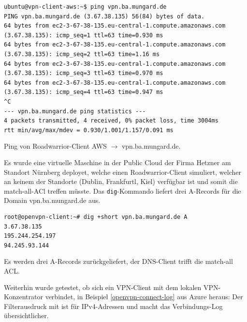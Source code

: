 \begin{listing}[h]
\begin{verbatim}
ubuntu@vpn-client-aws:~$ ping vpn.ba.mungard.de
PING vpn.ba.mungard.de (3.67.38.135) 56(84) bytes of data.
64 bytes from ec2-3-67-38-135.eu-central-1.compute.amazonaws.com (3.67.38.135): icmp_seq=1 ttl=63 time=0.930 ms
64 bytes from ec2-3-67-38-135.eu-central-1.compute.amazonaws.com (3.67.38.135): icmp_seq=2 ttl=63 time=1.16 ms
64 bytes from ec2-3-67-38-135.eu-central-1.compute.amazonaws.com (3.67.38.135): icmp_seq=3 ttl=63 time=0.970 ms
64 bytes from ec2-3-67-38-135.eu-central-1.compute.amazonaws.com (3.67.38.135): icmp_seq=4 ttl=63 time=0.947 ms
^C
--- vpn.ba.mungard.de ping statistics ---
4 packets transmitted, 4 received, 0% packet loss, time 3004ms
rtt min/avg/max/mdev = 0.930/1.001/1.157/0.091 ms

\end{verbatim}
\caption{Ping von Roadwarrior-Client AWS $\rightarrow$ vpn.ba.mungard.de.}
\label{ping-aws-ip}
\end{listing}\FloatBarrier
Es wurde eine virtuelle Maschine in der Public Cloud der Firma Hetzner am Standort Nürnberg deployet, welche einen Roadwarrior-Client simuliert, welcher an keinem der Standorte (Dublin, Frankfurtl, Kiel) verfügbar ist und somit die \glqq match-all\grqq-ACl treffen müsste. Das \texttt{dig}-Kommando liefert drei A-Records für die Domain vpn.ba.mungard.de aus.
\begin{listing}[h]
\begin{verbatim}
root@openvpn-client:~# dig +short vpn.ba.mungard.de A
3.67.38.135
195.244.254.197
94.245.93.144

\end{verbatim}
\caption{Es werden drei A-Records zurückgeliefert, der DNS-Client trifft die match-all ACL.}
\label{dig-match-all}
\end{listing}\FloatBarrier
\newpage
Weiterhin wurde getestet, ob sich ein VPN-Client mit dem lokalen VPN-Konzentrator verbindet, in Beispiel \ref{openvpn-connect-log} aus Azure heraus:
Der Filterausdruck mit  ist für IPv4-Adressen und macht das Verbindungs-Log übersichtlicher.
